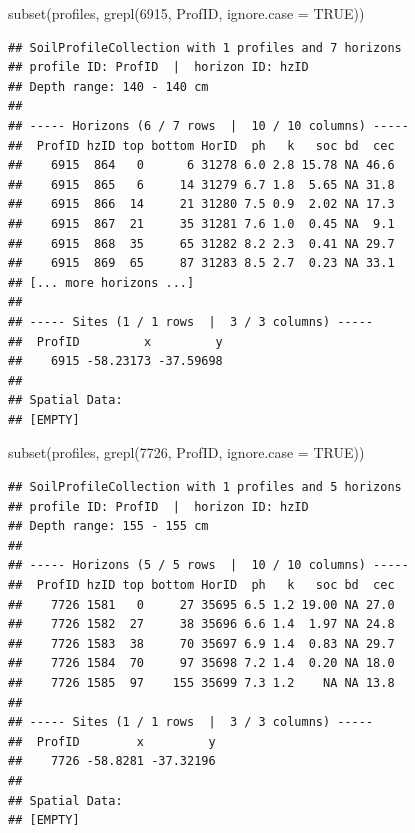 \documentclass[
  10pt,
  b5paper,
  oneside]{book}
\newenvironment{Shaded}{\begin{snugshade}}{\end{snugshade}}
\newcommand{\AttributeTok}[1]{\textcolor[rgb]{0.77,0.63,0.00}{#1}}
\newcommand{\ConstantTok}[1]{\textcolor[rgb]{0.00,0.00,0.00}{#1}}
\newcommand{\DecValTok}[1]{\textcolor[rgb]{0.00,0.00,0.81}{#1}}
\newcommand{\FunctionTok}[1]{\textcolor[rgb]{0.00,0.00,0.00}{#1}}
\newcommand{\NormalTok}[1]{#1}
\begin{document}
\begin{Shaded}
\begin{Highlighting}[]
\FunctionTok{subset}\NormalTok{(profiles, }\FunctionTok{grepl}\NormalTok{(}\DecValTok{6915}\NormalTok{, ProfID, }\AttributeTok{ignore.case =} \ConstantTok{TRUE}\NormalTok{))}
\end{Highlighting}
\end{Shaded}

\begin{verbatim}
## SoilProfileCollection with 1 profiles and 7 horizons
## profile ID: ProfID  |  horizon ID: hzID 
## Depth range: 140 - 140 cm
## 
## ----- Horizons (6 / 7 rows  |  10 / 10 columns) -----
##  ProfID hzID top bottom HorID  ph   k   soc bd  cec
##    6915  864   0      6 31278 6.0 2.8 15.78 NA 46.6
##    6915  865   6     14 31279 6.7 1.8  5.65 NA 31.8
##    6915  866  14     21 31280 7.5 0.9  2.02 NA 17.3
##    6915  867  21     35 31281 7.6 1.0  0.45 NA  9.1
##    6915  868  35     65 31282 8.2 2.3  0.41 NA 29.7
##    6915  869  65     87 31283 8.5 2.7  0.23 NA 33.1
## [... more horizons ...]
## 
## ----- Sites (1 / 1 rows  |  3 / 3 columns) -----
##  ProfID         x         y
##    6915 -58.23173 -37.59698
## 
## Spatial Data:
## [EMPTY]
\end{verbatim}

\begin{Shaded}
\begin{Highlighting}[]
\FunctionTok{subset}\NormalTok{(profiles, }\FunctionTok{grepl}\NormalTok{(}\DecValTok{7726}\NormalTok{, ProfID, }\AttributeTok{ignore.case =} \ConstantTok{TRUE}\NormalTok{))}
\end{Highlighting}
\end{Shaded}

\begin{verbatim}
## SoilProfileCollection with 1 profiles and 5 horizons
## profile ID: ProfID  |  horizon ID: hzID 
## Depth range: 155 - 155 cm
## 
## ----- Horizons (5 / 5 rows  |  10 / 10 columns) -----
##  ProfID hzID top bottom HorID  ph   k   soc bd  cec
##    7726 1581   0     27 35695 6.5 1.2 19.00 NA 27.0
##    7726 1582  27     38 35696 6.6 1.4  1.97 NA 24.8
##    7726 1583  38     70 35697 6.9 1.4  0.83 NA 29.7
##    7726 1584  70     97 35698 7.2 1.4  0.20 NA 18.0
##    7726 1585  97    155 35699 7.3 1.2    NA NA 13.8
## 
## ----- Sites (1 / 1 rows  |  3 / 3 columns) -----
##  ProfID        x         y
##    7726 -58.8281 -37.32196
## 
## Spatial Data:
## [EMPTY]
\end{verbatim}
\end{document}
